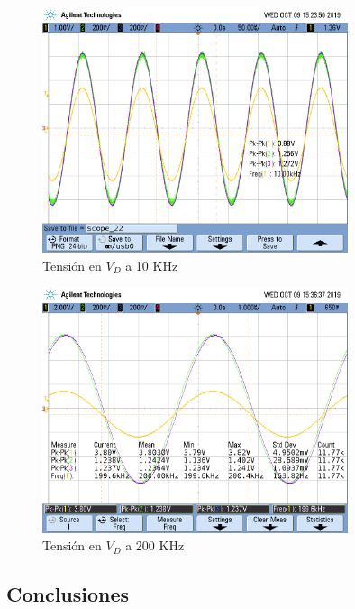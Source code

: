 \begin{figure}[H]
\centering
\includegraphics[width=0.8\textwidth,trim={0.25cm 5cm  1 5cm},clip]{Mediciones/Tensiones_10_KHz}
\caption{Tensión en $V_D$ a 10 KHz}
\label{fig:Tensiones_10_KHz}
\end{figure}

\begin{figure}[H]
\centering
\includegraphics[width=0.8\textwidth,trim={0.25cm 5cm  1 5cm},clip]{Mediciones/Tensiones_200_KHz}
\caption{Tensión en $V_D$ a 200 KHz}
\label{fig:Tensiones_200_KHz}
\end{figure}


\subsection{Conclusiones}

